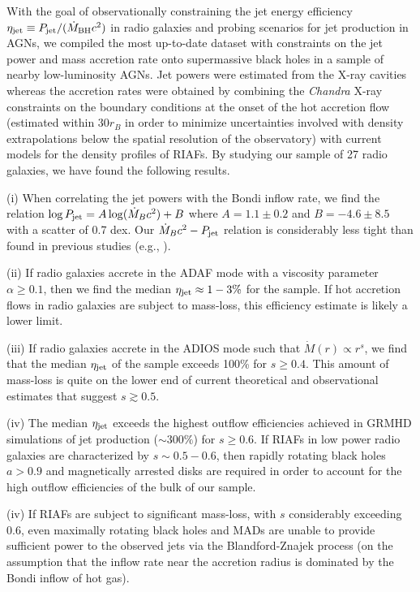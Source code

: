 \documentclass[useAMS,usenatbib]{mn2e}
\begin{document}
With the goal of observationally constraining the jet energy efficiency $\eta_{\rm jet} \equiv P_{\rm jet}/(\dot{M}_{\rm BH} c^2)$ in radio galaxies and probing scenarios for jet production in AGNs, 
we compiled the most up-to-date dataset with constraints on the jet power and mass accretion rate onto supermassive black holes in a sample of nearby low-luminosity AGNs. Jet powers were estimated from the X-ray cavities whereas the accretion rates were obtained by combining the \emph{Chandra} X-ray constraints on the boundary conditions at the onset of the hot accretion flow (estimated within $30 r_B$ in order to minimize uncertainties involved with density extrapolations below the spatial resolution of the observatory) with current models for the density profiles of RIAFs. By studying our sample of 27 radio galaxies, we have found the following results.

(i) When correlating the jet powers with the Bondi inflow rate, we find the relation $\log P_{\rm jet} = A \log (\dot{M}_B c^2) + B$ where $A=1.1 \pm 0.2$ and $B=-4.6 \pm 8.5$ with a scatter of 0.7 dex. Our $\dot{M}_B c^2 - P_{\rm jet}$ relation is considerably less tight than found in previous studies (e.g., \citealt{Allen06}). 

(ii) If radio galaxies accrete in the ADAF mode with a viscosity parameter $\alpha \geq 0.1$, then we find the median $\eta_{\rm jet} \approx 1-3\%$ for the sample. If hot accretion flows in radio galaxies are subject to mass-loss, this efficiency estimate is likely a lower limit. 

(iii) If radio galaxies accrete in the ADIOS mode such that $\dot{M}(r) \propto r^s$, we find that the median $\eta_{\rm jet}$ of the sample exceeds 100\% for $s \geq 0.4$. This amount of mass-loss is quite on the lower end of current theoretical and observational estimates that suggest $s \gtrsim 0.5$.

(iv) The median $\eta_{\rm jet}$ exceeds the highest outflow efficiencies achieved in GRMHD simulations of jet production ($\sim 300\%$) for $s \geq 0.6$. If RIAFs in low power radio galaxies are characterized by $s \sim 0.5-0.6$, then rapidly rotating black holes $a>0.9$ and magnetically arrested disks are required in order to account for the high outflow efficiencies of the bulk of our sample. 

(iv) If RIAFs are subject to significant mass-loss, with $s$ considerably exceeding 0.6, even maximally rotating black holes and MADs are unable to provide sufficient power to the observed jets via the Blandford-Znajek process (on the assumption that the inflow rate near the accretion radius is dominated by the Bondi inflow of hot gas).
\end{document}
